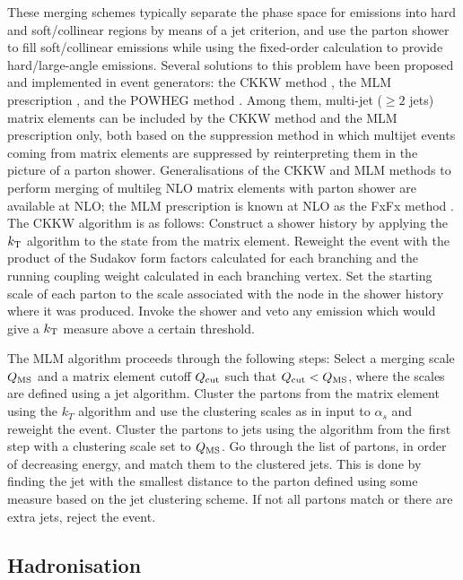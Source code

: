 These merging schemes typically separate the phase space for emissions into hard and soft/collinear regions by means of a jet criterion, and use the parton shower to fill soft/collinear emissions while using the fixed-order calculation to provide hard/large-angle emissions. Several solutions to this problem have been proposed and implemented in event generators: the CKKW method \cite{Catani:2001cc}, the MLM prescription \cite{Mangano:2006rw}, and the POWHEG method \cite{powbox1}. Among them, multi-jet ($\ge2$ jets) matrix elements can be included by the CKKW method and the MLM prescription only, both based on the suppression method in which multijet events coming from matrix elements are suppressed by reinterpreting them in the picture of a parton shower. Generalisations of the CKKW and MLM methods to perform merging of multileg NLO matrix elements with parton shower are available at NLO; the MLM prescription is known at NLO as the FxFx method \cite{Frederix:2012ps}.\\
The CKKW algorithm is as follows:
\bi
\ib Construct a shower history by applying the $k_{\rm T}$ algorithm to the state from the matrix element.
\ib Reweight the event with the product of the Sudakov form factors calculated for each branching and the running coupling weight calculated in each branching vertex.
\ib Set the starting scale of each parton to the scale associated with the node in the shower history where it was produced. Invoke the shower and veto any emission which would give a $k_{\rm T}$ measure above a certain threshold.
\ei

\noindent The MLM algorithm proceeds through the following steps:
\bi
\ib Select a merging scale $Q_{\rm MS}$ and a matrix element cutoff $Q_{\rm cut}$ such that $Q_{\rm cut}<Q_{\rm MS}$, where the scales are defined using a jet algorithm.
\ib Cluster the partons from the matrix element using the $k_{T}$ algorithm and use the clustering scales as in input to $\alpha_s$ and reweight the event.
\ib Cluster the partons to jets using the algorithm from the first step with a clustering scale set to $Q_{\rm MS}$. Go through the list of partons, in order of decreasing energy, and match them to the clustered jets. This is done by finding the jet with the smallest distance to the parton defined using some measure based on the jet clustering scheme. If not all partons match or there are extra jets, reject the event.
\ei



\subsection{Hadronisation}

